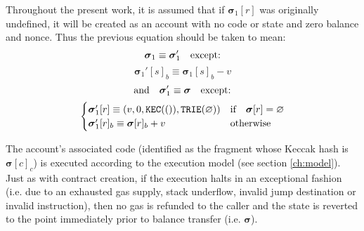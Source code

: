 \documentclass[9pt,oneside]{amsart}
\begin{document}
\begin{multicols}{2}
Throughout the present work, it is assumed that if $\boldsymbol{\sigma}_1[r]$ was originally undefined, it will be created as an account with no code or state and zero balance and nonce. Thus the previous equation should be taken to mean:
\begin{equation}
\boldsymbol{\sigma}_1 \equiv \boldsymbol{\sigma}_1' \quad \text{except:} \\
\end{equation}
\begin{equation}
\boldsymbol{\sigma}_1'[s]_b \equiv \boldsymbol{\sigma}_1[s]_b - v
\end{equation}
\begin{equation}
\text{and}\quad \boldsymbol{\sigma}_1' \equiv \boldsymbol{\sigma} \quad \text{except:} \\
\end{equation}
\begin{equation}
\begin{cases}
\boldsymbol{\sigma}_1'[r] \equiv (v, 0, \mathtt{\tiny KEC}(()), \mathtt{\tiny TRIE}(\varnothing)) & \text{if} \quad \boldsymbol{\sigma}[r] = \varnothing \\
\boldsymbol{\sigma}_1'[r]_b \equiv \boldsymbol{\sigma}[r]_b + v & \text{otherwise}
\end{cases}
\end{equation}

The account's associated code (identified as the fragment whose Keccak hash is $\boldsymbol{\sigma}[c]_c$) is executed according to the execution model (see section \ref{ch:model}). Just as with contract creation, if the execution halts in an exceptional fashion (i.e. due to an exhausted gas supply, stack underflow, invalid jump destination or invalid instruction), then no gas is refunded to the caller and the state is reverted to the point immediately prior to balance transfer (i.e. $\boldsymbol{\sigma}$).


\end{multicols}
\end{document}
